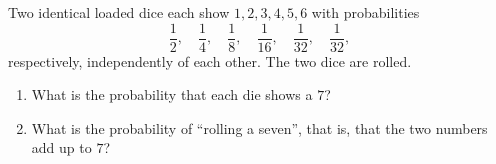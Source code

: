 Two identical loaded dice each show $1,2,3,4,5,6$ with probabilities
\[\dfrac12,\quad\dfrac14,\quad\dfrac18,\quad\dfrac{1}{16},\quad\dfrac{1}{32},\quad\dfrac{1}{32},\]
respectively, independently of each other. The two dice are rolled.
\begin{enumerate}
\item[(a)] What is the probability that each die shows a $7$?
\item[(b)] What is the probability of ``rolling a seven'', that is, that the two numbers add up to $7$?
\end{enumerate}
